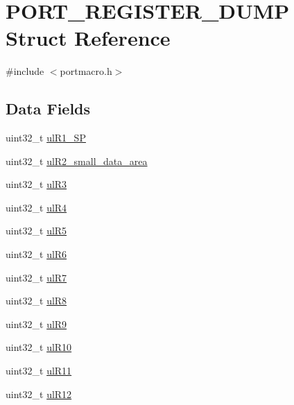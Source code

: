 \hypertarget{structPORT__REGISTER__DUMP}{\section{P\-O\-R\-T\-\_\-\-R\-E\-G\-I\-S\-T\-E\-R\-\_\-\-D\-U\-M\-P Struct Reference}
\label{structPORT__REGISTER__DUMP}
}


{\ttfamily \#include $<$portmacro.\-h$>$}

\subsection*{Data Fields}
\begin{DoxyCompactItemize}
\item 
uint32\-\_\-t \hyperlink{structPORT__REGISTER__DUMP_a0fada5574c869147730e5c6068b88374}{ul\-R1\-\_\-\-S\-P}
\item 
uint32\-\_\-t \hyperlink{structPORT__REGISTER__DUMP_a328676496a3ec9843b0de6628aa88539}{ul\-R2\-\_\-small\-\_\-data\-\_\-area}
\item 
uint32\-\_\-t \hyperlink{structPORT__REGISTER__DUMP_a2853e32e000e12a161227fb72339d46d}{ul\-R3}
\item 
uint32\-\_\-t \hyperlink{structPORT__REGISTER__DUMP_a2c072a2f08f2d0c5ed17d0f112c5c196}{ul\-R4}
\item 
uint32\-\_\-t \hyperlink{structPORT__REGISTER__DUMP_a014b0701d6f9517ecc95746a596e034e}{ul\-R5}
\item 
uint32\-\_\-t \hyperlink{structPORT__REGISTER__DUMP_a177724013500d0a469e60bd7fd553557}{ul\-R6}
\item 
uint32\-\_\-t \hyperlink{structPORT__REGISTER__DUMP_a051e0354406783f057127f70c77fa55b}{ul\-R7}
\item 
uint32\-\_\-t \hyperlink{structPORT__REGISTER__DUMP_aff5a51611a9d2b4704b7afb3e9ae0dd5}{ul\-R8}
\item 
uint32\-\_\-t \hyperlink{structPORT__REGISTER__DUMP_a1b453e5f815d3a8b36c99a7ea006d864}{ul\-R9}
\item 
uint32\-\_\-t \hyperlink{structPORT__REGISTER__DUMP_a900cc8cdf9fd9a0a1f136936793de1f1}{ul\-R10}
\item 
uint32\-\_\-t \hyperlink{structPORT__REGISTER__DUMP_aa5066a8798bc801eb995477118e1b8ac}{ul\-R11}
\item 
uint32\-\_\-t \hyperlink{structPORT__REGISTER__DUMP_ab7d610d7b115b5e102d5582fd336768f}{ul\-R12}
\item 

\end{DoxyCompactItemize}
